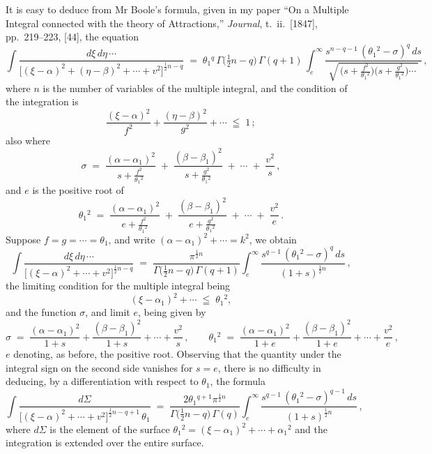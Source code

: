 \documentclass[11pt]{article}
\begin{document}
It is easy to deduce from Mr Boole's formula, given in my paper ``On a Multiple Integral connected with the theory of Attractions,'' \emph{Journal}, t.\ ii.\ [1847], pp.\ 219--223, [44], the equation
\[
\int \frac{d\xi\, d\eta\,\cdots}
{\bigl[(\xi-\alpha)^{2}+(\eta-\beta)^{2}+\cdots+v^{2}\bigr]^{\frac{1}{2}n-q}}
\;=\;
\theta_{1}{}^{q}\,\Gamma\!\bigl(\tfrac{1}{2}n-q\bigr)\,\Gamma(q+1)\,
\int_{e}^{\infty}\!\frac{s^{n-q-1}\,(\theta_{1}{}^{2}-\sigma)^{q}\,ds}
{\sqrt{\,\bigl(s+\tfrac{f^{2}}{\theta_{1}{}^{2}}\bigr)\bigl(s+\tfrac{g^{2}}{\theta_{1}{}^{2}}\bigr)\cdots\,}}\,,
\]
where $n$ is the number of variables of the multiple integral, and the condition of the integration is
\[
\frac{(\xi-\alpha)^{2}}{f^{2}} + \frac{(\eta-\beta)^{2}}{g^{2}} + \cdots \;\leqq\; 1\,;
\]
also where
\[
\sigma \;=\; \frac{(\alpha-\alpha_{1})^{2}}{s + \tfrac{f^{2}}{\theta_{1}{}^{2}}}
  \;+\; \frac{(\beta-\beta_{1})^{2}}{s + \tfrac{g^{2}}{\theta_{1}{}^{2}}}
  \;+\; \cdots
  \;+\; \frac{v^{2}}{s}\,,
\]
and $e$ is the positive root of
\[
\theta_{1}{}^{2} \;=\; \frac{(\alpha-\alpha_{1})^{2}}{e+\tfrac{f^{2}}{\theta_{1}{}^{2}}}
\;+\; \frac{(\beta-\beta_{1})^{2}}{e+\tfrac{g^{2}}{\theta_{1}{}^{2}}}
\;+\;\cdots\;+\;\frac{v^{2}}{e}\,.
\]
Suppose $f = g = \cdots = \theta_{1}$, and write $(\alpha-\alpha_{1})^{2}+\cdots = k^{2}$, we obtain
\[
\int \frac{d\xi\, d\eta\,\cdots}
{\bigl[(\xi-\alpha)^{2}+\cdots+v^{2}\bigr]^{\frac{1}{2}n-q}}
\;=\;
\frac{\pi^{\frac{1}{2}n}}{\Gamma\!\bigl(\tfrac{1}{2}n-q\bigr)\,\Gamma(q+1)}
\int_{e}^{\infty}\!\frac{s^{q-1}\,(\theta_{1}{}^{2}-\sigma)^{q}\,ds}{(1+s)^{\frac{1}{2}n}}\,,
\]
the limiting condition for the multiple integral being
\[
(\xi-\alpha_{1})^{2} + \cdots \;\leqq\; \theta_{1}{}^{2},
\]
and the function $\sigma$, and limit $e$, being given by
\[
\sigma \;=\; \frac{(\alpha-\alpha_{1})^{2}}{1+s} + \frac{(\beta-\beta_{1})^{2}}{1+s} + \cdots + \frac{v^{2}}{s}\,,\qquad
\theta_{1}{}^{2} \;=\; \frac{(\alpha-\alpha_{1})^{2}}{1+e} + \frac{(\beta-\beta_{1})^{2}}{1+e} + \cdots + \frac{v^{2}}{e}\,,
\]
$e$ denoting, as before, the positive root. Observing that the quantity under the integral sign on the second side vanishes for $s=e$, there is no difficulty in deducing, by a differentiation with respect to $\theta_{1}$, the formula
\[
\int \frac{d\Sigma}
{\bigl[(\xi-\alpha)^{2}+\cdots+v^{2}\bigr]^{\frac{1}{2}n-q+1}\,\theta_{1}}
\;=\;
\frac{2\theta_{1}{}^{q+1}\pi^{\frac{1}{2}n}}{\Gamma\!\bigl(\tfrac{1}{2}n-q\bigr)\,\Gamma(q)}
\int_{e}^{\infty}\!\frac{s^{q-1}\,(\theta_{1}{}^{2}-\sigma)^{q-1}\,ds}{(1+s)^{\frac{1}{2}n}}\,,
\]
where $d\Sigma$ is the element of the surface $\theta_{1}{}^{2} = (\xi-\alpha_{1})^{2}+\cdots+\alpha_{1}{}^{2}$ and the integration is extended over the entire surface.
\end{document}
